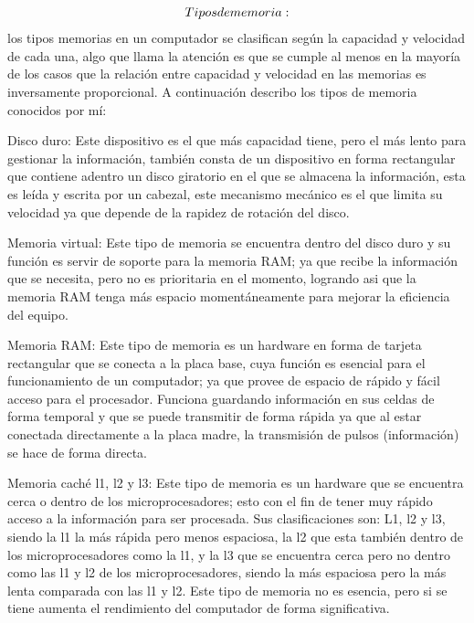 \documentclass{article}
\begin{document}
    \vspace{1cm}
        \begin{align}
        
        \LARGE
        Tipos de memoria:
        
        \end{align}
los tipos memorias en un computador se clasifican según la capacidad y velocidad de cada una, algo que llama la atención es que se cumple al menos en la mayoría de los casos que la relación entre capacidad y velocidad en las memorias es inversamente proporcional. A continuación describo los tipos de memoria conocidos por mí:

    \vspace{0.5cm}
Disco duro: Este dispositivo es el que más capacidad tiene, pero el más lento para gestionar la información, también consta de un dispositivo en forma rectangular que contiene adentro un disco giratorio en el que se almacena la información, esta es leída y escrita por un cabezal, este mecanismo mecánico es el que limita su velocidad ya que depende de la rapidez de rotación del disco.

    \vspace{0.5cm}
Memoria virtual: Este tipo de memoria se encuentra dentro del disco duro y su función es servir de soporte para la memoria RAM; ya que recibe la información que se necesita, pero no es prioritaria en el momento, logrando asi que la memoria RAM tenga más espacio momentáneamente para mejorar la eficiencia del equipo.

    \vspace{0.5cm}
Memoria RAM: Este tipo de memoria es un hardware en forma de tarjeta rectangular que se conecta a la placa base, cuya función es esencial para el funcionamiento de un computador; ya que provee de espacio de rápido y fácil acceso para el procesador. Funciona guardando información en sus celdas de forma temporal y que se puede transmitir de forma rápida ya que al estar conectada directamente a la placa madre, la transmisión de pulsos (información) se hace de forma directa.

    \vspace{0.5cm}
Memoria caché l1, l2 y l3: Este tipo de memoria es un hardware que se encuentra cerca o dentro de los microprocesadores; esto con el fin de tener muy rápido acceso a la información para ser procesada. Sus clasificaciones son: L1, l2 y l3, siendo la l1 la más rápida pero menos espaciosa, la l2 que esta también dentro de los microprocesadores como la l1, y la l3 que se encuentra cerca pero no dentro como las l1 y l2 de los microprocesadores, siendo la más espaciosa pero la más lenta comparada con las l1 y l2. Este tipo de memoria no es esencia, pero si se tiene aumenta el rendimiento del computador de forma significativa.
\end{document}
